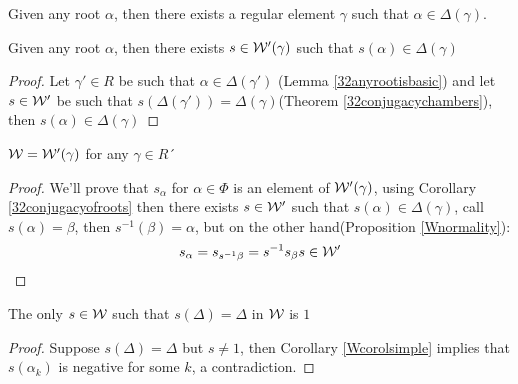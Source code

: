 \begin{lema}
	Given any root $\alpha$, then there exists a regular element $\gamma$ such that $\alpha \in \Delta(\gamma)$.
	\label{32anyrootisbasic}
\end{lema}
\begin{corol}
	Given any root $\alpha$, then there exists $s \in \mathcal{W}'(\gamma)$ such that $s(\alpha) \in \Delta(\gamma)$
	\label{32conjugacyofroots}
\end{corol}
\begin{proof}
	Let $\gamma' \in R$ be such that $\alpha \in \Delta(\gamma')$ (Lemma \ref{32anyrootisbasic}) and let $s \in \mathcal{W}'$ be such that $s(\Delta(\gamma'))=\Delta(\gamma)$(Theorem \ref{32conjugacychambers}), then $s(\alpha) \in \Delta(\gamma)$
\end{proof} 
\begin{prop}
	$\mathcal{W} = \mathcal{W}'(\gamma)$ for any $\gamma \in R$´
\end{prop}
\begin{proof}
	We'll prove that $s_\alpha$ for $\alpha \in \Phi$ is an element of $\mathcal{W}'(\gamma)$, using Corollary \ref{32conjugacyofroots} then there exists $s \in \mathcal{W}'$ such that $s(\alpha) \in \Delta(\gamma)$, call $s(\alpha)=\beta$, then $s^{-1}(\beta)=\alpha$, but on the other hand(Proposition \ref{Wnormality}):
	$$s_\alpha = s_{s^{-1}\beta} = s^{-1}s_\beta s \in \mathcal{W}' $$
\end{proof}
\begin{prop}
	The only $s \in \mathcal{W}$ such that $s(\Delta)=\Delta$ in $\mathcal{W}$ is $1$
\end{prop}
\begin{proof}
	Suppose $s(\Delta)=\Delta$ but $s \not= 1$, then Corollary \ref{Wcorolsimple} implies that $s(\alpha_k)$ is negative for some $k$, a contradiction.
	
\end{proof}